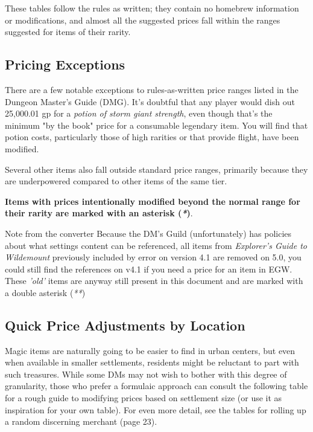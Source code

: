 \documentclass[10pt,a4paper,twoside,bg=print,twocolumn,openany,nodeprecatedcode]{dndbook}
\begin{document}
These tables follow the rules as written; they contain no homebrew information or modifications, and almost all the suggested prices fall within the ranges suggested for items of their rarity.

\subsection{Pricing Exceptions}
There are a few notable exceptions to rules-as-written price ranges listed in the Dungeon Master's Guide (DMG). It's doubtful that any player would dish out 25,000.01 gp for a \textit{potion of storm giant strength}, even though that's the minimum "by the book" price for a consumable legendary item. You will find that potion costs, particularly those of high rarities or that provide flight, have been modified.

Several other items also fall outside standard price ranges, primarily because they are underpowered compared to other items of the same tier.

\textbf{Items with prices intentionally modified beyond the normal range for their rarity are marked with an asterisk (\textit{*})}.

\begin{DndSidebar}[float=!b]{Note from the converter}
Because the DM's Guild (unfortunately) has policies about what settings content can be referenced, all items from \textit{Explorer's Guide to Wildemount} previously included by error on version 4.1 are removed on 5.0, you could still find the references on v4.1 if you need a price for an item in EGW. These \textit{'old'} items are anyway still present in this document and are marked with a double asterisk (\textit{**})



\end{DndSidebar}

\subsection{Quick Price Adjustments by Location}
Magic items are naturally going to be easier to find in urban centers, but even when available in smaller settlements, residents might be reluctant to part with such treasures. While some DMs may not wish to bother with this degree of granularity, those who prefer a formulaic approach can consult the following table for a rough guide to modifying prices based on settlement size (or use it as inspiration for your own table). For even more detail, see the tables for rolling up a random discerning merchant (page 23).
\end{document}
